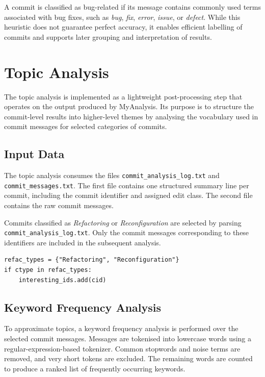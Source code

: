 A commit is classified as bug-related if its message contains commonly used terms associated with bug fixes, such as \emph{bug}, \emph{fix}, \emph{error}, \emph{issue}, or \emph{defect}. While this heuristic does not guarantee perfect accuracy, it enables efficient labelling of commits and supports later grouping and interpretation of results.

\section{Topic Analysis}

The topic analysis is implemented as a lightweight post-processing step that operates on the output produced by MyAnalysis. Its purpose is to structure the commit-level results into higher-level themes by analysing the vocabulary used in commit messages for selected categories of commits.

\subsection{Input Data}

The topic analysis consumes the files \texttt{commit\_analysis\_log.txt} and \texttt{commit\_messages.txt}. The first file contains one structured summary line per commit, including the commit identifier and assigned edit class. The second file contains the raw commit messages.

Commits classified as \emph{Refactoring} or \emph{Reconfiguration} are selected by parsing \texttt{commit\_analysis\_log.txt}. Only the commit messages corresponding to these identifiers are included in the subsequent analysis.

\begin{lstlisting}[style=mypicturestyle, caption={Selecting refactoring and reconfiguration commits from the analysis log}, label={lst:select}]
refac_types = {"Refactoring", "Reconfiguration"}
if ctype in refac_types:
    interesting_ids.add(cid)
\end{lstlisting}

\subsection{Keyword Frequency Analysis}

To approximate topics, a keyword frequency analysis is performed over the selected commit messages. Messages are tokenised into lowercase words using a regular-expression-based tokenizer. Common stopwords and noise terms are removed, and very short tokens are excluded. The remaining words are counted to produce a ranked list of frequently occurring keywords.


